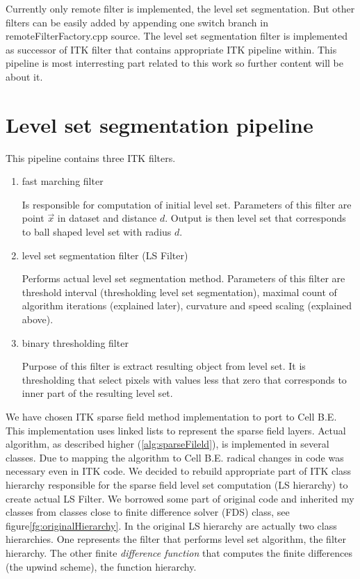 Currently only remote filter is implemented, the level set segmentation.
But other filters can be easily added by appending one switch branch in remoteFilterFactory.cpp source.
The level set segmentation filter is implemented as successor of ITK filter that contains appropriate ITK pipeline within.
This pipeline is most interresting part related to this work so further content will be about it.

\section{Level set segmentation pipeline}

This pipeline contains three ITK filters.
\begin{enumerate}
  \item{fast marching filter}
  \par
  Is responsible for computation of initial level set.
Parameters of this filter are point $\vec{x}$ in dataset and distance $d$.
Output is then level set that corresponds to ball shaped level set with radius $d$.

  \item{level set segmentation filter (LS Filter)}
  \par
  Performs actual level set segmentation method.
Parameters of this filter are threshold interval (thresholding level set segmentation),  maximal count of algorithm iterations (explained later), curvature and speed scaling (explained above).

  \item{binary thresholding filter}
  \par
  Purpose of this filter is extract resulting object from level set.
It is thresholding that select pixels with values less that zero that corresponds to inner part of the resulting level set.
\end{enumerate}

We have chosen ITK sparse field method implementation to port to Cell B.E.
This implementation uses linked lists to represent the sparse field layers.
Actual algorithm, as described higher (\ref{alg:sparseFileld}), is implemented in several classes.
Due to mapping the algorithm to Cell B.E. radical changes in code was necessary even in ITK code.
We decided to rebuild appropriate part of ITK class hierarchy responsible for the sparse field level set computation (LS hierarchy) to create actual LS Filter.
We borrowed some part of original code and inherited my classes from classes close to finite difference solver (FDS) class, see figure\ref{fg:originalHierarchy}.
In the original LS hierarchy are actually two class hierarchies.
One represents the filter that performs level set algorithm, the filter hierarchy.
The other finite \emph{difference function} that computes the finite differences (the upwind scheme), the function hierarchy.

